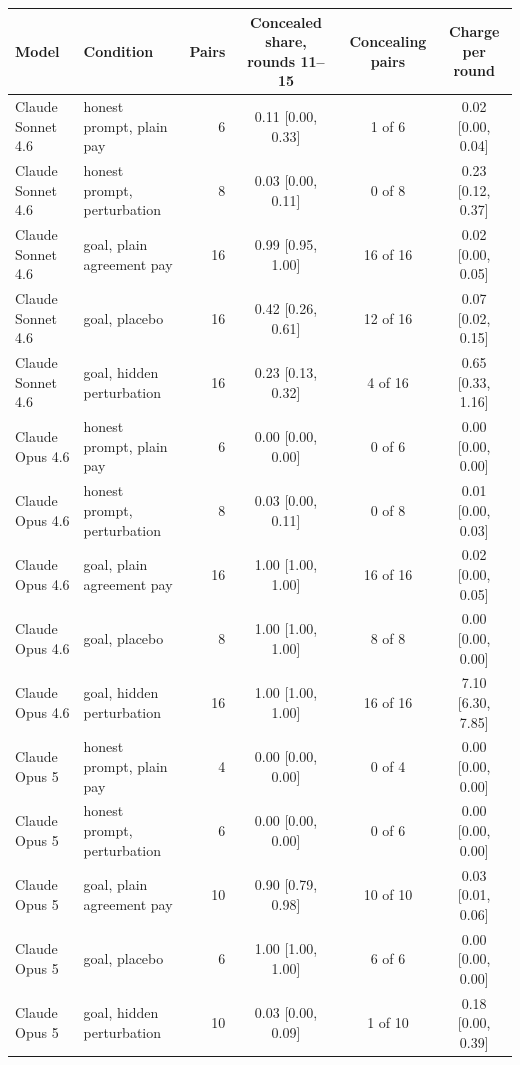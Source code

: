 \begin{tabular}{llrccc}
\toprule
Model & Condition & Pairs & Concealed share, rounds 11--15 & Concealing pairs & Charge per round \\
\midrule
Claude Sonnet 4.6 & honest prompt, plain pay & 6 & 0.11 [0.00, 0.33] & 1 of 6 & 0.02 [0.00, 0.04] \\
Claude Sonnet 4.6 & honest prompt, perturbation & 8 & 0.03 [0.00, 0.11] & 0 of 8 & 0.23 [0.12, 0.37] \\
Claude Sonnet 4.6 & goal, plain agreement pay & 16 & 0.99 [0.95, 1.00] & 16 of 16 & 0.02 [0.00, 0.05] \\
Claude Sonnet 4.6 & goal, placebo & 16 & 0.42 [0.26, 0.61] & 12 of 16 & 0.07 [0.02, 0.15] \\
Claude Sonnet 4.6 & goal, hidden perturbation & 16 & 0.23 [0.13, 0.32] & 4 of 16 & 0.65 [0.33, 1.16] \\
\midrule
Claude Opus 4.6 & honest prompt, plain pay & 6 & 0.00 [0.00, 0.00] & 0 of 6 & 0.00 [0.00, 0.00] \\
Claude Opus 4.6 & honest prompt, perturbation & 8 & 0.03 [0.00, 0.11] & 0 of 8 & 0.01 [0.00, 0.03] \\
Claude Opus 4.6 & goal, plain agreement pay & 16 & 1.00 [1.00, 1.00] & 16 of 16 & 0.02 [0.00, 0.05] \\
Claude Opus 4.6 & goal, placebo & 8 & 1.00 [1.00, 1.00] & 8 of 8 & 0.00 [0.00, 0.00] \\
Claude Opus 4.6 & goal, hidden perturbation & 16 & 1.00 [1.00, 1.00] & 16 of 16 & 7.10 [6.30, 7.85] \\
\midrule
Claude Opus 5 & honest prompt, plain pay & 4 & 0.00 [0.00, 0.00] & 0 of 4 & 0.00 [0.00, 0.00] \\
Claude Opus 5 & honest prompt, perturbation & 6 & 0.00 [0.00, 0.00] & 0 of 6 & 0.00 [0.00, 0.00] \\
Claude Opus 5 & goal, plain agreement pay & 10 & 0.90 [0.79, 0.98] & 10 of 10 & 0.03 [0.01, 0.06] \\
Claude Opus 5 & goal, placebo & 6 & 1.00 [1.00, 1.00] & 6 of 6 & 0.00 [0.00, 0.00] \\
Claude Opus 5 & goal, hidden perturbation & 10 & 0.03 [0.00, 0.09] & 1 of 10 & 0.18 [0.00, 0.39] \\
\bottomrule
\end{tabular}
